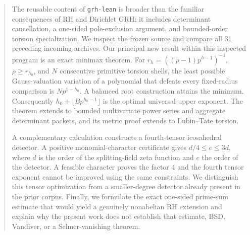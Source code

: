 \documentclass[11pt]{article}
\theoremstyle{definition}
\theoremstyle{remark}
\begin{document}
\hypersetup{pageanchor=true}
\begin{abstract}
The reusable content of \texttt{grh-lean} is broader than the familiar consequences of RH and Dirichlet GRH: it includes determinant cancellation, a one-sided pole-exclusion argument, and bounded-order torsion specialization. We inspect the frozen source and compare all 31 preceding incoming archives. Our principal new result within this inspected program is an exact minimax theorem. For \(r_h=((p-1)p^{h-1})^{-1}\), \(\rho\ge r_{h_0}\), and \(N\) consecutive primitive torsion shells, the least possible Gauss-valuation variation of a polynomial that defeats every fixed-radius comparison is \(Np^{1-h_0}\). A balanced root construction attains the minimum. Consequently \(h_0+\lfloor Bp^{h_0-1}\rfloor\) is the optimal universal upper exponent. The theorem extends to bounded multivariate power series and aggregate determinant packets, and its metric proof extends to Lubin--Tate torsion.

A complementary calculation constructs a fourth-tensor icosahedral detector. A positive monomial-character certificate gives \(d/4\le e\le3d\), where \(d\) is the order of the splitting-field zeta function and \(e\) the order of the detector. A feasible character proves the factor \(4\) and the fourth tensor exponent cannot be improved using the same constraints. We distinguish this tensor optimization from a smaller-degree detector already present in the prior corpus. Finally, we formulate the exact one-sided prime-sum estimate that would yield a genuinely nonabelian RH extension and explain why the present work does not establish that estimate, BSD, Vandiver, or a Selmer-vanishing theorem.
\end{abstract}
\tableofcontents
\newpage








\end{document}
